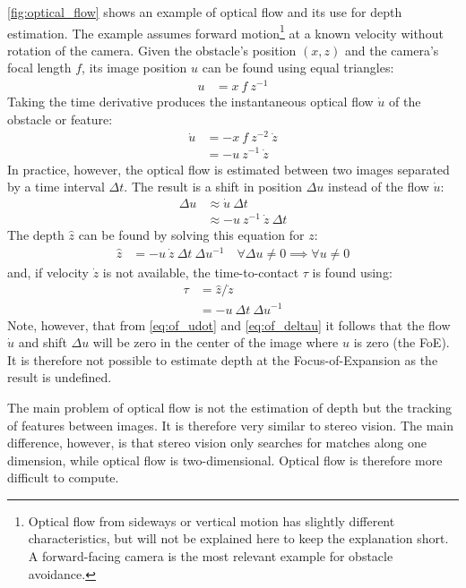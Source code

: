 \autoref{fig:optical_flow} shows an example of optical flow and its use for depth estimation.
The example assumes forward motion\footnote{Optical flow from sideways or vertical motion has slightly different characteristics, but will not be explained here to keep the explanation short. A forward-facing camera is the most relevant example for obstacle avoidance.} at a known velocity without rotation of the camera.
Given the obstacle's position $(x, z)$ and the camera's focal length $f$, its image position $u$ can be found using equal triangles:
\begin{align}
u &= x \ f \ z^{-1}
\end{align}
Taking the time derivative produces the instantaneous optical flow $\dot u$ of the obstacle or feature:
\begin{align}
\dot u &= -x \ f \ z^{-2} \ \dot z \\
&= - u \ z^{-1} \ \dot z \label{eq:of_udot}
\end{align}
In practice, however, the optical flow is estimated between two images separated by a time interval $\Delta t$. The result is a shift in position $\Delta u$ instead of the flow $\dot u$:
\begin{align}
\Delta u &\approx \dot u \ \Delta t \\
&\approx - u \ z^{-1} \ \dot z \ \Delta t \label{eq:of_deltau}
\end{align}
The depth $\hat z$ can be found by solving this equation for $z$:
\begin{align}
\hat z &= -u \ \dot z \ \Delta t \ \Delta u^{-1} \quad \forall \Delta u \neq 0 \implies \forall u \neq 0
\end{align}
and, if velocity $\dot z$ is not available, the time-to-contact $\tau$ is found using:
\begin{align}
\tau &= \hat z / \dot z \\
&= -u\ \Delta t \ \Delta u^{-1}
\end{align}
Note, however, that from \autoref{eq:of_udot} and \ref{eq:of_deltau} it follows that the flow $\dot u$ and shift $\Delta u$ will be zero in the center of the image where $u$ is zero (the \acl{FoE}).
It is therefore not possible to estimate depth at the Focus-of-Expansion as the result is undefined.

\medskip

The main problem of optical flow is not the estimation of depth but the tracking of features between images.
It is therefore very similar to stereo vision.
The main difference, however, is that stereo vision only searches for matches along one dimension, while optical flow is two-dimensional.
Optical flow is therefore more difficult to compute.

